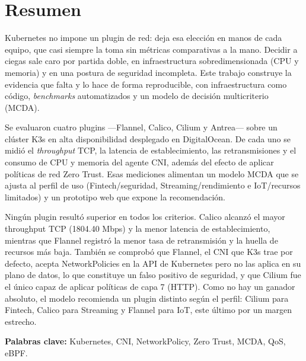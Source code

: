 \chapter{Resumen}
Kubernetes no impone un plugin de red: deja esa elección en manos de
cada equipo, que casi siempre la toma sin métricas comparativas a la
mano. Decidir a ciegas sale caro por partida doble, en infraestructura
sobredimensionada (CPU y memoria) y en una postura de seguridad
incompleta. Este trabajo construye la evidencia que falta y lo hace de
forma reproducible, con infraestructura como código, \emph{benchmarks}
automatizados y un modelo de decisión multicriterio (MCDA).

Se evaluaron cuatro plugins ---Flannel, Calico, Cilium y Antrea---
sobre un clúster K3s en alta disponibilidad desplegado en DigitalOcean.
De cada uno se midió el \emph{throughput} TCP, la latencia de
establecimiento, las retransmisiones y el consumo de CPU y memoria del
agente CNI, además del efecto de aplicar políticas de red Zero Trust.
Esas mediciones alimentan un modelo MCDA que se ajusta al perfil de uso
(Fintech/seguridad, Streaming/rendimiento e IoT/recursos limitados) y un
prototipo web que expone la recomendación.

Ningún plugin resultó superior en todos los criterios. Calico alcanzó
el mayor throughput TCP (1804.40 Mbps) y la menor latencia de
establecimiento, mientras que Flannel registró la menor tasa de
retransmisión y la huella de recursos más baja. También se comprobó que
Flannel, el CNI que K3s trae por defecto, acepta NetworkPolicies en la
API de Kubernetes pero no las aplica en su plano de datos, lo que
constituye un falso positivo de seguridad, y que Cilium fue el único
capaz de aplicar políticas de capa 7 (HTTP). Como no hay un ganador
absoluto, el modelo recomienda un plugin distinto según el perfil:
Cilium para Fintech, Calico para Streaming y Flannel para IoT, este
último por un margen estrecho.

\vspace{1cm}
\textbf{Palabras clave:} Kubernetes, CNI, NetworkPolicy, Zero Trust, MCDA, QoS, eBPF.